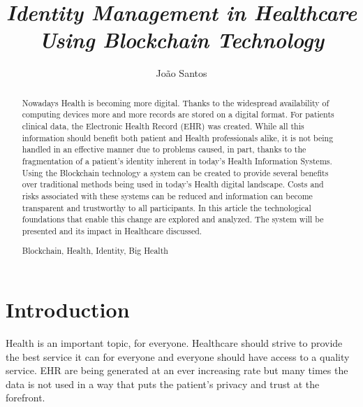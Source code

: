 \documentclass[notitlepage]{llncs}
\newcommand{\keywords}[1]{\par\addvspace\baselineskip
\noindent\keywordname\enspace\ignorespaces#1}
\begin{document}
\title{%
\textit{Identity Management in Healthcare Using Blockchain Technology}}

\author{%
João Santos}


{\def\addcontentsline#1#2#3{}\maketitle}



\begin{abstract}
Nowadays Health is becoming more digital. Thanks to the widespread availability of computing devices more and more records are stored on a digital format. For patients clinical data, the Electronic Health Record (EHR) was created. While all this information should benefit both patient and Health professionals alike, it is not being handled in an effective manner due to problems caused, in part, thanks to the fragmentation of a patient's identity inherent in today's Health Information Systems. Using the Blockchain technology a system can be created to provide several benefits over traditional methods being used in today's Health digital landscape. Costs and risks associated with these systems can be reduced and information can become transparent and trustworthy to all participants. In this article the technological foundations that enable this change are explored and analyzed. The system will be presented and its impact in Healthcare discussed.
\keywords{Blockchain, Health, Identity, Big Health}
\end{abstract}


\section{Introduction}

Health is an important topic, for everyone. Healthcare should strive to provide the best service it can for everyone and everyone should have access to a quality service. EHR are being generated at an ever increasing rate but many times the data is not used in a way that puts the patient's privacy and trust at the forefront.
\end{document}
